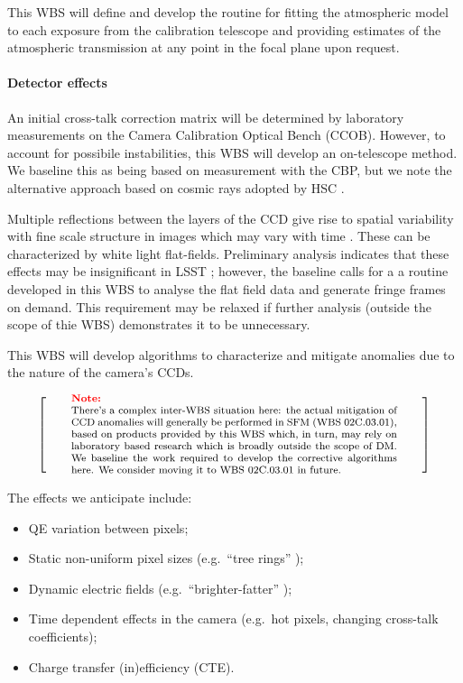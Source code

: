 \documentclass[12pt]{article}
\newcommand{\wbsSFM}{WBS 02C.03.01}
\newenvironment{note}[1][Note]
{
  \begin{displaymath}
    \left[ \qquad
    \begin{minipage}[h]{.75\linewidth}
      \color{red} \footnotesize
      \textbf{#1:} \newline
      \color{black}
}
{
    \end{minipage}
    \normalsize
    \qquad \right]
  \end{displaymath}
}
\begin{document}
This WBS will define and develop the routine for fitting the atmospheric model to each exposure from the calibration telescope and providing estimates of the atmospheric transmission at any point in the focal plane upon request.

\paragraph{Detector effects}

An initial cross-talk correction matrix will be determined by laboratory measurements on the Camera Calibration Optical Bench (CCOB). However, to account for possibile instabilities, this WBS will develop an on-telescope method. We baseline this as being based on measurement with the CBP, but we note the alternative approach based on cosmic rays adopted by HSC \cite{Furusawa14}.

Multiple reflections between the layers of the CCD give rise to spatial variability with fine scale structure in images which may vary with time \cite[\S2.5.1]{Lupton15}. These can be characterized by white light flat-fields. Preliminary analysis indicates that these effects may be insignificant in LSST \cite{Rasmussen15}; however, the baseline calls for a a routine developed in this WBS to analyse the flat field data and generate fringe frames on demand. This requirement may be relaxed if further analysis (outside the scope of thie WBS) demonstrates it to be unnecessary.


This WBS will develop algorithms to characterize and mitigate anomalies due to the nature of the camera's CCDs.

\begin{note}
There's a complex inter-WBS situation here: the actual mitigation of CCD anomalies will generally be performed in SFM (\wbsSFM{}), based on products provided by this WBS which, in turn, may rely on laboratory based research which is broadly outside the scope of DM\@. We baseline the work required to develop the corrective algorithms here. We consider moving it to \wbsSFM{} in future.
\end{note}

The effects we anticipate include:

\begin{itemize}
  \item{QE variation between pixels;}
  \item{Static non-uniform pixel sizes (e.g.\ ``tree rings'' \cite{Stubbs14});}
  \item{Dynamic electric fields (e.g.\ ``brighter-fatter'' \cite{Antilogus14});}
  \item{Time dependent effects in the camera (e.g.\ hot pixels, changing cross-talk coefficients);}
  \item{Charge transfer (in)efficiency (CTE).}
\end{itemize}
\end{document}
